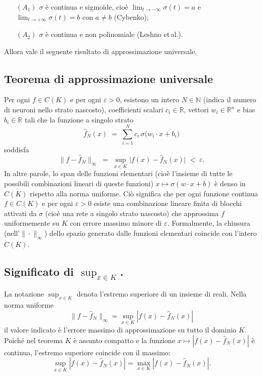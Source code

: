 \documentclass[a4paper,12pt]{report}
\begin{document}
	\begin{enumerate}
		\item[\((A_1)\)] \(\sigma\) è continua e sigmoide, cioè \(\lim_{t\to -\infty}\sigma(t)=a\) e \(\lim_{t\to +\infty}\sigma(t)=b\) con \(a\neq b\) (Cybenko);
		\item[\((A_2)\)] \(\sigma\) è continua e non polinomiale (Leshno et\,al.). 
	\end{enumerate}
	
	Allora vale il seguente risultato di approssimazione universale.
	
	\subsection{Teorema di approssimazione universale}
	Per ogni \(f\in C(K)\) e per ogni \(\varepsilon>0\), esistono un intero \(N\in\mathbb{N}\) (indica il numero di neuroni nello strato nascosto), coefficienti scalari \(c_i\in\mathbb{R}\), vettori \(w_i\in\mathbb{R}^n\) e bias \(b_i\in\mathbb{R}\) tali che la funzione a singolo strato
	\[
	\hat f_N(x) \;=\; \sum_{i=1}^N c_i\,\sigma\bigl(w_i\cdot x + b_i\bigr)
	\]
	soddisfa
	\[
	\|f - \hat f_N\|_\infty \;=\; \sup_{x\in K} \bigl|f(x)-\hat f_N(x)\bigr| \;<\; \varepsilon.
	\]
	In altre parole, lo span delle funzioni elementari (cioè l'insieme di tutte le possibili combinazioni lineari di queste funzioni) \(x\mapsto\sigma(w\cdot x + b)\) è denso in \(C(K)\) rispetto alla norma uniforme. Ciò significa che per ogni funzione continua \(f\in C(K)\) e per ogni \(\varepsilon>0\) esiste una combinazione lineare finita di blocchi attivati da \(\sigma\) (cioè una rete a singolo strato nascosto) che approssima \(f\) uniformemente su \(K\) con errore massimo minore di \(\varepsilon\). Formalmente, la chiusura (nell'\(\|\cdot\|_\infty\)) dello spazio generato dalle funzioni elementari coincide con l'intero \(C(K)\).
	
	\subsection{Significato di \(\sup_{x\in K}\).}
	La notazione \(\sup_{x\in K}\) denota l'estremo superiore di un insieme di reali. Nella norma uniforme
	\[
	\|f-\hat f_N\|_\infty=\sup_{x\in K}|f(x)-\hat f_N(x)|
	\]
	il valore indicato è l'errore massimo di approssimazione su tutto il dominio \(K\). Poiché nel teorema \(K\) è assunto compatto e la funzione \(x\mapsto|f(x)-\hat f_N(x)|\) è continua, l'estremo superiore coincide con il massimo:
	\[
	\sup_{x\in K}|f(x)-\hat f_N(x)|=\max_{x\in K}|f(x)-\hat f_N(x)|.
	\]
	
\end{document}
